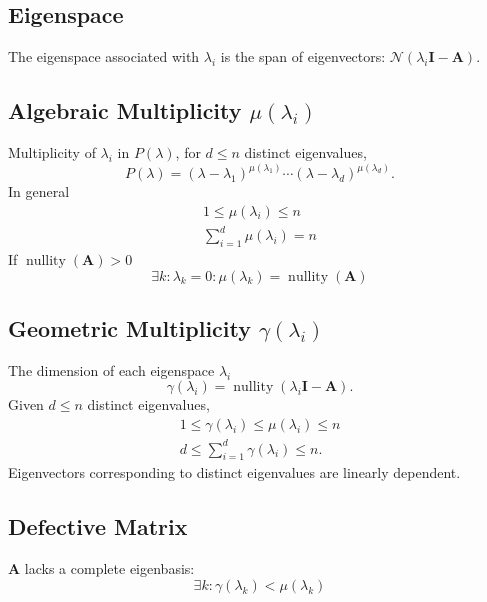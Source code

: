 \documentclass{article}
\DeclareMathOperator*{\nullity}{nullity}
\begin{document}
\begin{multicols*}{3}
    \subsection{Eigenspace} 
    The eigenspace associated with \(\lambda_i\) is the span of eigenvectors: \(\mathcal{N}{\left( \lambda_i \symbf{I} - \symbf{A} \right)}\). 
    \subsection{Algebraic Multiplicity \texorpdfstring{\(\mu\left( \lambda_i \right)\)}{mu(lambda i)}}
    Multiplicity of \(\lambda_i\) in \(P(\lambda)\),
    for \(d \leq n\) distinct eigenvalues,
    \begin{equation*}
        P\left( \lambda \right) = \left( \lambda - \lambda_1 \right)^{\mu\left( \lambda_1 \right)} \cdots \left( \lambda - \lambda_d \right)^{\mu\left( \lambda_d \right)}.
    \end{equation*}
    In general
    \begin{gather*}
        1 \leq \mu\left( \lambda_i \right) \leq n         \\
        \sum_{i = 1}^d \mu \left( \lambda_i \right) = n
    \end{gather*}
    If \(\nullity{\left( \symbf{A} \right)} > 0\)
    \begin{equation*}
        \exists k : \lambda_k = 0 : \mu\left( \lambda_k \right) = \nullity{\left( \symbf{A} \right)}
    \end{equation*}
    \subsection{Geometric Multiplicity \texorpdfstring{\(\gamma\left( \lambda_i \right)\)}{gamma(lambda i)}}
    The dimension of each eigenspace \(\lambda_i\)
    \begin{equation*}
        \gamma \left( \lambda_i \right) = \nullity{\left( \lambda_i \symbf{I} - \symbf{A} \right)}.
    \end{equation*}
    Given \(d \leq n\) distinct eigenvalues,
    \begin{gather*}
        1 \leq \gamma\left( \lambda_i \right) \leq \mu\left( \lambda_i \right) \leq n \\
        d \leq \sum_{i = 1}^d \gamma \left( \lambda_i \right) \leq n.
    \end{gather*}
    Eigenvectors corresponding to distinct eigenvalues are linearly dependent.
    \subsection{Defective Matrix}
    \(\symbf{A}\) lacks a complete eigenbasis:
    \begin{equation*}
        \exists k : \gamma\left( \lambda_k \right) < \mu\left( \lambda_k \right)
    \end{equation*}

\end{multicols*}
\end{document}
